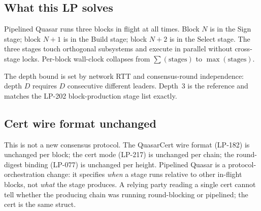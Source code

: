 \subsection{What this LP solves}

Pipelined Quasar runs three blocks in flight at all times. Block $N$
is in the Sign stage; block $N{+}1$ is in the Build stage; block
$N{+}2$ is in the Select stage. The three stages touch orthogonal
subsystems and execute in parallel without cross-stage locks. Per-block
wall-clock collapses from $\sum(\textrm{stages})$ to
$\max(\textrm{stages})$.

The depth bound is set by network RTT and consensus-round
independence: depth $D$ requires $D$ consecutive different leaders.
Depth~3 is the reference and matches the LP-202 block-production
stage list exactly.

\subsection{Cert wire format unchanged}

This is not a new consensus protocol. The QuasarCert wire format
(LP-182) is unchanged per block; the cert mode (LP-217) is unchanged
per chain; the round-digest binding (LP-077) is unchanged per height.
Pipelined Quasar is a protocol-orchestration change: it specifies
\emph{when} a stage runs relative to other in-flight blocks, not
\emph{what} the stage produces. A relying party reading a single cert
cannot tell whether the producing chain was running round-blocking
or pipelined; the cert is the same struct.
